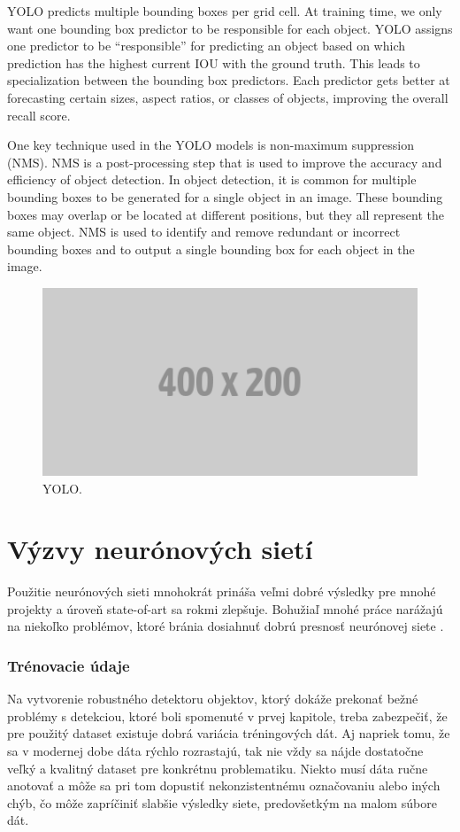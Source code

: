 YOLO predicts multiple bounding boxes per grid cell. At training time, we only want one bounding box predictor to be responsible for each object. YOLO assigns one predictor to be “responsible” for predicting an object based on which prediction has the highest current IOU with the ground truth. This leads to specialization between the bounding box predictors. Each predictor gets better at forecasting certain sizes, aspect ratios, or classes of objects, improving the overall recall score.

One key technique used in the YOLO models is non-maximum suppression (NMS). NMS is a post-processing step that is used to improve the accuracy and efficiency of object detection. In object detection, it is common for multiple bounding boxes to be generated for a single object in an image. These bounding boxes may overlap or be located at different positions, but they all represent the same object. NMS is used to identify and remove redundant or incorrect bounding boxes and to output a single bounding box for each object in the image.

\begin{figure}[ht]
    \centering
    \includegraphics[width=1\textwidth]{images/placeholder.png}
    \caption{YOLO.}
    \label{img:ch2}
\end{figure}

\section{Výzvy neurónových sietí}
Použitie neurónových sieti mnohokrát prináša veľmi dobré výsledky pre mnohé projekty a úroveň state-of-art sa rokmi zlepšuje. Bohužiaľ mnohé práce narážajú na niekoľko problémov, ktoré bránia dosiahnuť dobrú presnosť neurónovej siete \cite{RosinPaulL2019RIAa}.

\subsubsection{Trénovacie údaje}
Na vytvorenie robustného detektoru objektov, ktorý dokáže prekonať bežné problémy s detekciou, ktoré boli spomenuté v prvej kapitole, treba zabezpečiť, že pre použitý dataset existuje dobrá variácia tréningových dát. Aj napriek tomu, že sa v modernej dobe dáta rýchlo rozrastajú, tak nie vždy sa nájde dostatočne veľký a kvalitný dataset pre konkrétnu problematiku. Niekto musí dáta ručne anotovať a môže sa pri tom dopustiť nekonzistentnému označovaniu alebo iných chýb, čo môže zapríčiniť slabšie výsledky siete, predovšetkým na malom súbore dát.

